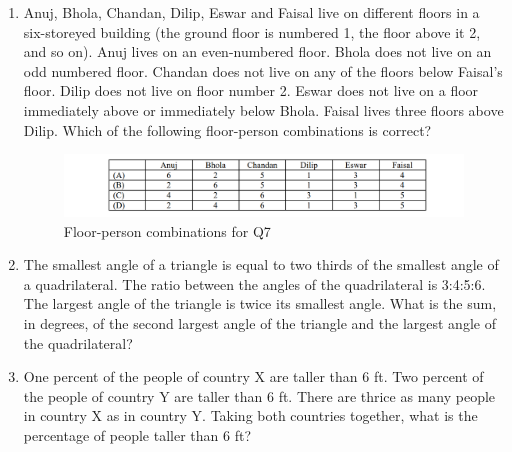 \documentclass[journal,12pt,onecolumn]{IEEEtran}
\theoremstyle{remark}
\begin{document}
\begin{enumerate}
\begin{multicols}{4}
\begin{enumerate}
\item ALRVX
\item EPVZB
\item ITZDF
\item OYEIK
\end{enumerate}
\end{multicols}


\item Anuj, Bhola, Chandan, Dilip, Eswar and Faisal live on different floors in a six-storeyed building (the ground floor is numbered 1, the floor above it 2, and so on). Anuj lives on an even-numbered floor. Bhola does not live on an odd numbered floor. Chandan does not live on any of the floors below Faisal's floor. Dilip does not live on floor number 2. Eswar does not live on a floor immediately above or immediately below Bhola. Faisal lives three floors above Dilip. Which of the following floor-person combinations is correct?  \hfill{}

\begin{figure}[H]
\centering
\includegraphics[width=\columnwidth]{figs/image1.png}
\caption{Floor-person combinations for Q7}
\label{fig:q7-floorplan}
\end{figure}



\item The smallest angle of a triangle is equal to two thirds of the smallest angle of a quadrilateral. The ratio between the angles of the quadrilateral is 3:4:5:6. The largest angle of the triangle is twice its smallest angle. What is the sum, in degrees, of the second largest angle of the triangle and the largest angle of the quadrilateral? \hfill{}

\item One percent of the people of country X are taller than 6 ft. Two percent of the people of country Y are taller than 6 ft. There are thrice as many people in country X as in country Y. Taking both countries together, what is the percentage of people taller than 6 ft?  \hfill{}


\end{enumerate}
\end{document}
